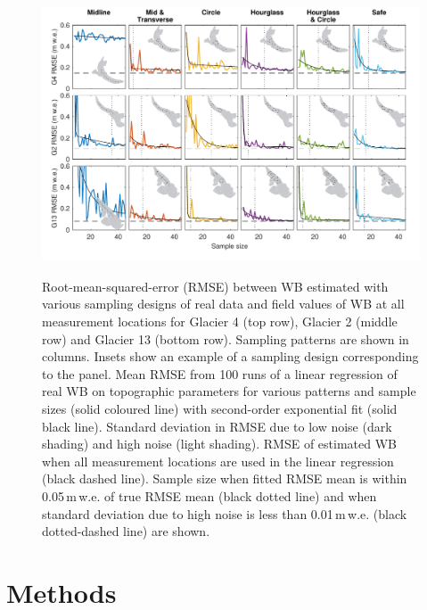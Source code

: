 \documentclass[twocolumn,letterpaper]{igs}
\begin{document}
\begin{figure}
	\centering
	\includegraphics[width =\textwidth]{DataObsWB.pdf}\\
	\caption{Root-mean-squared-error (RMSE) between WB estimated with various sampling designs of real data and field values of WB at all measurement locations for Glacier 4 (top row), Glacier 2 (middle row) and Glacier 13 (bottom row). Sampling patterns are shown in columns. Insets show an example of a sampling design corresponding to the panel. Mean RMSE from 100 runs of a linear regression of real WB on topographic parameters for various patterns and sample sizes (solid coloured line) with second-order exponential fit (solid black line). Standard deviation in RMSE due to low noise (dark shading) and high noise (light shading). RMSE of estimated WB when all measurement locations are used in the linear regression (black dashed line). Sample size when fitted RMSE mean is within 0.05\,m\,w.e. of true RMSE mean (black dotted line) and when standard deviation due to high noise is less than 0.01\,m\,w.e. (black dotted-dashed line) are shown.}
	\label{fig:RealObsWB}
\end{figure}


\section{Methods}
\end{document}
